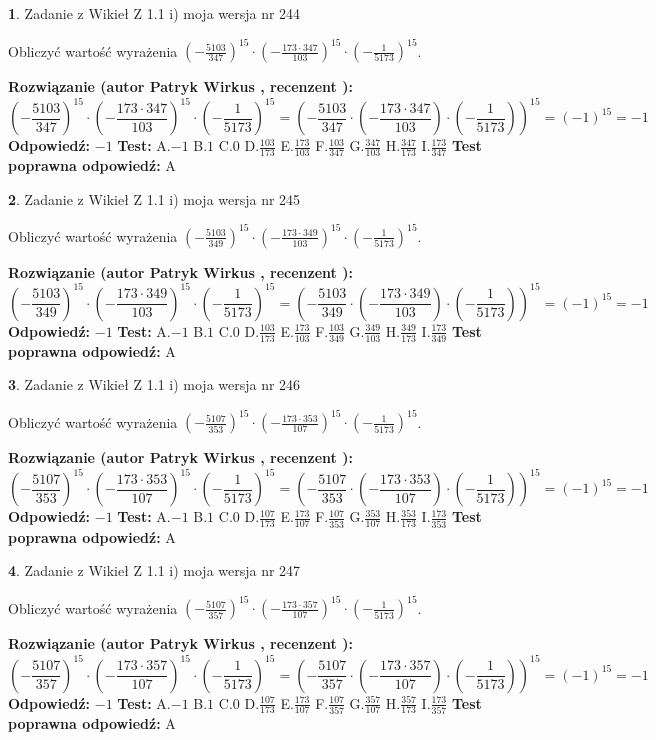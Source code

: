 \documentclass[12pt, a4paper]{article}
\theoremstyle{definition} %
\newtheorem{zad}{}
\newcommand{\zadStart}[1]{\begin{zad}#1\newline}
\newcommand{\zadStop}{\end{zad}}
\newcommand{\rozwStart}[2]{\noindent \textbf{Rozwiązanie (autor #1 , recenzent #2): }\newline}
\newcommand{\rozwStop}{\newline}
\newcommand{\odpStart}{\noindent \textbf{Odpowiedź:}\newline}
\newcommand{\odpStop}{\newline}
\newcommand{\testStart}{\noindent \textbf{Test:}\newline}
\newcommand{\testStop}{\newline}
\newcommand{\kluczStart}{\noindent \textbf{Test poprawna odpowiedź:}\newline}
\newcommand{\kluczStop}{\newline}
\begin{document}
\zadStart{Zadanie z Wikieł Z 1.1 i) moja wersja nr 244}

Obliczyć wartość wyrażenia $(-\frac{5103}{347})^{15} \cdot (-\frac{173 \cdot 347}{103})^{15} \cdot (-\frac{1}{5173})^{15}$.
\zadStop
\rozwStart{Patryk Wirkus}{}
$$(-\frac{5103}{347})^{15} \cdot (-\frac{173 \cdot 347}{103})^{15} \cdot (-\frac{1}{5173})^{15} = (-\frac{5103}{347} \cdot (-\frac{173 \cdot 347}{103}) \cdot (-\frac{1}{5173}))^{15} = (-1)^{15} = -1$$
\rozwStop
\odpStart
$-1$
\odpStop
\testStart
A.$-1$ B.$1$ C.$0$ D.$\frac{103}{173}$ E.$\frac{173}{103}$
F.$\frac{103}{347}$ G.$\frac{347}{103}$
H.$\frac{347}{173}$
I.$\frac{173}{347}$
\testStop
\kluczStart
A
\kluczStop



\zadStart{Zadanie z Wikieł Z 1.1 i) moja wersja nr 245}

Obliczyć wartość wyrażenia $(-\frac{5103}{349})^{15} \cdot (-\frac{173 \cdot 349}{103})^{15} \cdot (-\frac{1}{5173})^{15}$.
\zadStop
\rozwStart{Patryk Wirkus}{}
$$(-\frac{5103}{349})^{15} \cdot (-\frac{173 \cdot 349}{103})^{15} \cdot (-\frac{1}{5173})^{15} = (-\frac{5103}{349} \cdot (-\frac{173 \cdot 349}{103}) \cdot (-\frac{1}{5173}))^{15} = (-1)^{15} = -1$$
\rozwStop
\odpStart
$-1$
\odpStop
\testStart
A.$-1$ B.$1$ C.$0$ D.$\frac{103}{173}$ E.$\frac{173}{103}$
F.$\frac{103}{349}$ G.$\frac{349}{103}$
H.$\frac{349}{173}$
I.$\frac{173}{349}$
\testStop
\kluczStart
A
\kluczStop



\zadStart{Zadanie z Wikieł Z 1.1 i) moja wersja nr 246}

Obliczyć wartość wyrażenia $(-\frac{5107}{353})^{15} \cdot (-\frac{173 \cdot 353}{107})^{15} \cdot (-\frac{1}{5173})^{15}$.
\zadStop
\rozwStart{Patryk Wirkus}{}
$$(-\frac{5107}{353})^{15} \cdot (-\frac{173 \cdot 353}{107})^{15} \cdot (-\frac{1}{5173})^{15} = (-\frac{5107}{353} \cdot (-\frac{173 \cdot 353}{107}) \cdot (-\frac{1}{5173}))^{15} = (-1)^{15} = -1$$
\rozwStop
\odpStart
$-1$
\odpStop
\testStart
A.$-1$ B.$1$ C.$0$ D.$\frac{107}{173}$ E.$\frac{173}{107}$
F.$\frac{107}{353}$ G.$\frac{353}{107}$
H.$\frac{353}{173}$
I.$\frac{173}{353}$
\testStop
\kluczStart
A
\kluczStop



\zadStart{Zadanie z Wikieł Z 1.1 i) moja wersja nr 247}

Obliczyć wartość wyrażenia $(-\frac{5107}{357})^{15} \cdot (-\frac{173 \cdot 357}{107})^{15} \cdot (-\frac{1}{5173})^{15}$.
\zadStop
\rozwStart{Patryk Wirkus}{}
$$(-\frac{5107}{357})^{15} \cdot (-\frac{173 \cdot 357}{107})^{15} \cdot (-\frac{1}{5173})^{15} = (-\frac{5107}{357} \cdot (-\frac{173 \cdot 357}{107}) \cdot (-\frac{1}{5173}))^{15} = (-1)^{15} = -1$$
\rozwStop
\odpStart
$-1$
\odpStop
\testStart
A.$-1$ B.$1$ C.$0$ D.$\frac{107}{173}$ E.$\frac{173}{107}$
F.$\frac{107}{357}$ G.$\frac{357}{107}$
H.$\frac{357}{173}$
I.$\frac{173}{357}$
\testStop
\kluczStart
A
\kluczStop
\end{document}
